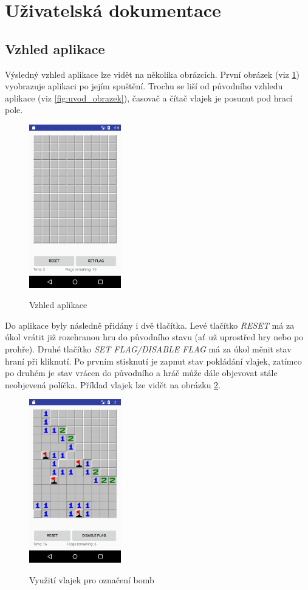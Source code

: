 \documentclass[12pt, a4paper]{article}
\begin{document}
\section{Uživatelská dokumentace}
\subsection{Vzhled aplikace}
Výsledný vzhled aplikace lze vidět na několika obrázcích. První obrázek (viz \ref{fig:uvodni}) vyobrazuje aplikaci po jejím spuštění. Trochu se liší od původního vzhledu aplikace (viz \ref{fig:uvod_obrazek}), časovač a čítač vlajek je posunut pod hrací pole.
	\begin{figure}[h!]
	\centering
	\includegraphics[width=4cm]{img/uvodni}\\
	\caption{Vzhled aplikace}
	\label{fig:uvodni}
	\end{figure}
\par
Do aplikace byly následně přidány i dvě tlačítka. Levé tlačítko \textit{RESET} má za úkol vrátit již rozehranou hru do původního stavu (ať už uprostřed hry nebo po prohře). Druhé tlačítko \textit{SET FLAG/DISABLE FLAG} má za úkol měnit stav hraní při kliknutí. Po prvním stisknutí je zapnut stav pokládání vlajek, zatímco po druhém je stav vrácen do původního a hráč může dále objevovat stále neobjevená políčka. Příklad vlajek lze vidět na obrázku \ref{fig:vlajky}.
\newpage
	\begin{figure}[h!]
	\centering
	\includegraphics[width=4cm]{img/vlajky}\\
	\caption{Využití vlajek pro označení bomb}
	\label{fig:vlajky}
	\end{figure}
\end{document}
